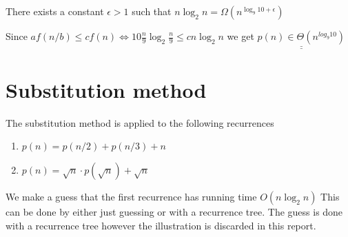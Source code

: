 \documentclass[12pt]{article}
\begin{document}
There exists a constant $\epsilon > 1$ such that $n\log _2 n = \Omega (n^{\log _9 10 + \epsilon})$

Since $af(n/b) \leq cf(n) \Leftrightarrow 10\frac{n}{9}\log _2 \frac{n}{9} \leq cn\log _2 n$ we get $\underline{\underline{p(n) \in \Theta(n^{log_9 10})}}$

\section{Substitution method}

The substitution method is applied to the following recurrences

\begin{enumerate}
\item $p(n) = p(n/2) + p(n/3) + n$
\item $p(n) = \sqrt{n} \cdot p(\sqrt{n}) + \sqrt{n}$
\end{enumerate}

We make a guess that the first recurrence has running time $O(n\log _2 n)$
This can be done by either just guessing or with a recurrence tree. 
The guess is done with a recurrence tree however the illustration is discarded
in this report.
\end{document}
